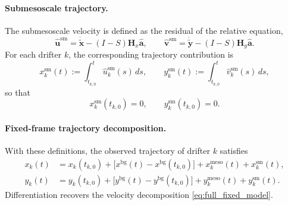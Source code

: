 \documentclass{article}
\begin{document}
\paragraph{Submesoscale trajectory.}
The submesoscale velocity is defined as the residual of the relative equation,
\begin{equation}
\hat{\mathbf{u}}^{\mathrm{sm}}
=
\dot{\tilde{\mathbf{x}}}
-
(I-S)\mathbf{H}_x\hat{\mathbf a},
\qquad
\hat{\mathbf{v}}^{\mathrm{sm}}
=
\dot{\tilde{\mathbf{y}}}
-
(I-S)\mathbf{H}_y\hat{\mathbf a}.
\end{equation}
For each drifter $k$, the corresponding trajectory contribution is
\begin{equation}
x_k^{\mathrm{sm}}(t)
:=
\int_{t_{k,0}}^{t} \hat{u}_k^{\mathrm{sm}}(s)\,ds,
\qquad
y_k^{\mathrm{sm}}(t)
:=
\int_{t_{k,0}}^{t} \hat{v}_k^{\mathrm{sm}}(s)\,ds,
\end{equation}
so that
\begin{equation}
x_k^{\mathrm{sm}}(t_{k,0})=0,
\qquad
y_k^{\mathrm{sm}}(t_{k,0})=0.
\end{equation}

\paragraph{Fixed-frame trajectory decomposition.}
With these definitions, the observed trajectory of drifter $k$ satisfies
\begin{align}
x_k(t)
&=
x_k(t_{k,0})
+
\bigl[x^{\mathrm{bg}}(t)-x^{\mathrm{bg}}(t_{k,0})\bigr]
+
x_k^{\mathrm{meso}}(t)
+
x_k^{\mathrm{sm}}(t),
\\
y_k(t)
&=
y_k(t_{k,0})
+
\bigl[y^{\mathrm{bg}}(t)-y^{\mathrm{bg}}(t_{k,0})\bigr]
+
y_k^{\mathrm{meso}}(t)
+
y_k^{\mathrm{sm}}(t).
\end{align}
Differentiation recovers the velocity decomposition
\eqref{eq:full_fixed_model}.
\end{document}
